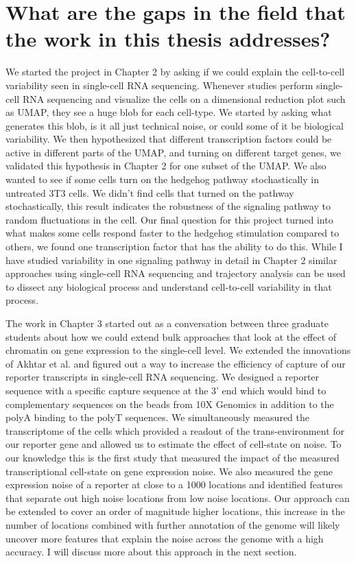 \section{What are the gaps in the field that the work in this thesis addresses?}

We started the project in Chapter 2 by asking if we could explain the cell-to-cell variability seen in single-cell RNA sequencing. Whenever studies perform single-cell RNA sequencing and visualize the cells on a dimensional reduction plot such as UMAP, they see a huge blob for each cell-type. We started by asking what generates this blob, is it all just technical noise, or could some of it be biological variability. We then hypothesized that different transcription factors could be active in different parts of the UMAP, and turning on different target genes, we validated this hypothesis in Chapter 2 for one subset of the UMAP. We also wanted to see if some cells turn on the hedgehog pathway stochastically in untreated 3T3 cells. We didn't find cells that turned on the pathway stochastically, this result indicates the robustness of the signaling pathway to random fluctuations in the cell. Our final question for this project turned into what makes some cells respond faster to the hedgehog stimulation compared to others, we found one transcription factor that has the ability to do this. While I have studied variability in one signaling pathway in detail in Chapter 2 similar approaches using single-cell RNA sequencing and trajectory analysis can be used to dissect any biological process and understand cell-to-cell variability in that process.

The work in Chapter 3 started out as a conversation between three graduate students about how we could extend bulk approaches that look at the effect of chromatin on gene expression to the single-cell level. We extended the innovations of Akhtar et al. \cite{akhtarw_vansteenselb:ChromatinPosition2013} and figured out a way to increase the efficiency of capture of our reporter transcripts in single-cell RNA sequencing. We designed a reporter sequence with a specific capture sequence at the 3' end which would bind to complementary sequences on the beads from 10X Genomics in addition to the polyA binding to the polyT sequences. We simultaneously measured the transcriptome of the cells which provided a readout of the trans-environment for our reporter gene and allowed us to estimate the effect of cell-state on noise. To our knowledge this is the first study that measured the impact of the measured transcriptional cell-state on gene expression noise. We also measured the gene expression noise of a reporter at close to a 1000 locations and identified features that separate out high noise locations from low noise locations. Our approach can be extended to cover an order of magnitude higher locations, this increase in the number of locations combined with further annotation of the genome will likely uncover more features that explain the noise across the genome with a high accuracy. I will discuss more about this approach in the next section.

